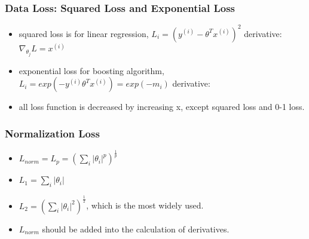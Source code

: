 \begin{frame}
\frametitle{Data Loss: Squared Loss and Exponential Loss}
	\small
	\begin{itemize}
		\item squared loss is for linear regression, $L_i=(y^{(i)}-\theta^Tx^{(i)})^2$
		\hspace{1cm} derivative:$\nabla_{\theta_j} L=x^{(i)}$
		\item exponential loss for boosting algorithm, $L_i=exp(-y^{(i)}\theta^Tx^{(i)})=exp(-m_i)$
		\hspace{1cm} derivative:
		\item all loss function is decreased by increasing x, except squared loss and 0-1 loss.
	\end{itemize}
\end{frame}
\begin{frame}
\frametitle{Normalization Loss}
	\small
	\begin{itemize}
	\item $L_{norm}=L_p=(\sum_i|\theta_i|^p)^{\frac{1}{p}}$
	\item $L_1=\sum_i|\theta_i|$
	\item $L_2=(\sum_i|\theta_i|^2)^{\frac{1}{2}}$, which is the most widely used.
	\item $L_{norm}$ should be added into the calculation of derivatives.
	\end{itemize}
\end{frame}
\ifx\allfiles\undefined

\fi
